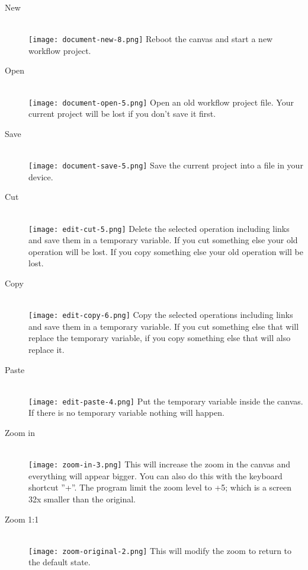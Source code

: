 \documentclass[a4paper,10pt]{article}
\begin{document}
    \begin{description}
      \item[New] \hfill \\
      \texttt{[image: document-new-8.png]} Reboot the canvas and start a new workflow project.

      \item[Open] \hfill \\
      \texttt{[image: document-open-5.png]} Open an old workflow project file. Your current project will be lost if you don't save it first.

      \item[Save] \hfill \\
      \texttt{[image: document-save-5.png]}	Save the current project into a file in your device.

      \item[Cut] \hfill \\
      \texttt{[image: edit-cut-5.png]} Delete the selected operation including links and save them in a temporary variable. If you cut something else your old operation will be lost. If you copy something else your old operation will be lost.

      \item[Copy] \hfill \\
      \texttt{[image: edit-copy-6.png]} Copy the selected operations including links and save them in a temporary variable. If you cut something else that will replace the temporary variable, if you copy something else that will also replace it.

      \item[Paste] \hfill \\
      \texttt{[image: edit-paste-4.png]} Put the temporary variable inside the canvas. If there is no temporary variable nothing will happen.

      \item[Zoom in] \hfill \\
      \texttt{[image: zoom-in-3.png]} This will increase the zoom in the canvas and everything will appear bigger. You can also do this with the keyboard shortcut ''+''. The program limit the zoom level to +5; which is a screen 32x smaller than the original.

      \item[Zoom 1:1] \hfill \\
      \texttt{[image: zoom-original-2.png]} This will modify the zoom to return to the default state.


\end{description}
\end{document}
